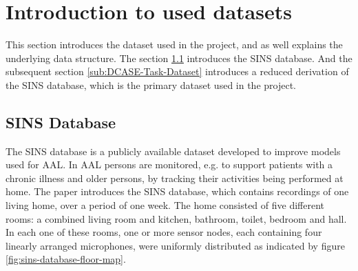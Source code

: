 \section{Introduction to used datasets}
\label{sec:Introduction-Used-Datasets}
This section introduces the dataset used in the project, and as well explains the underlying data structure. The section \ref{sub:SINS-Database} introduces the \gls{SINS} database. And the subsequent section \ref{sub:DCASE-Task-Dataset} introduces a reduced derivation of the \gls{SINS} database, which is the primary dataset used in the project.

\subsection{SINS Database}
\label{sub:SINS-Database}
The \gls{SINS} database is a publicly available dataset developed to improve models used for \gls{AAL}. In \gls{AAL} persons are monitored, e.g. to support patients with a chronic illness and older persons, by tracking their activities being performed at home.
\newline
\newline
The paper \cite{dekkers_sins_2017} introduces the \gls{SINS} database, which contains recordings of one living home, over a period of one week. The home consisted of five different rooms: a combined living room and kitchen, bathroom, toilet, bedroom and hall. In each one of these rooms, one or more sensor nodes, each containing four linearly arranged microphones, were uniformly distributed as indicated by figure \ref{fig:sins-database-floor-map}.

